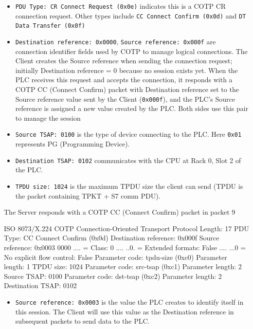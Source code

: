 \documentclass[../main.tex]{subfiles}
\begin{document}
\begin{itemize}
    \item \texttt{PDU Type: CR Connect Request (0x0e)} indicates this is a COTP CR connection request. Other types include \texttt{CC Connect Confirm (0x0d)} and \texttt{DT Data Transfer (0x0f)}

    \item \texttt{Destination reference: 0x0000}, \texttt{Source reference: 0x000f} are connection identifier fields used by COTP to manage logical connections. The Client creates the Source reference when sending the connection request; initially Destination reference = 0 because no session exists yet. When the PLC receives this request and accepts the connection, it responds with a COTP CC (Connect Confirm) packet with Destination reference set to the Source reference value sent by the Client (\texttt{0x000f}), and the PLC's Source reference is assigned a new value created by the PLC. Both sides use this pair to manage the session

    \item \texttt{Source TSAP: 0100} is the type of device connecting to the PLC. Here \texttt{0x01} represents PG (Programming Device).

    \item \texttt{Destination TSAP: 0102} communicates with the CPU at Rack 0, Slot 2 of the PLC.

    \item \texttt{TPDU size: 1024} is the maximum TPDU size the client can send (TPDU is the packet containing TPKT + S7 comm PDU).
\end{itemize}

The Server responds with a COTP CC (Connect Confirm) packet in packet 9

\begin{packetdump}
ISO 8073/X.224 COTP Connection-Oriented Transport Protocol
    Length: 17
    PDU Type: CC Connect Confirm (0x0d)
    Destination reference: 0x000f
    Source reference: 0x0003
    0000 .... = Class: 0
    .... ..0. = Extended formats: False
    .... ...0 = No explicit flow control: False
    Parameter code: tpdu-size (0xc0)
    Parameter length: 1
    TPDU size: 1024
    Parameter code: src-tsap (0xc1)
    Parameter length: 2
    Source TSAP: 0100
    Parameter code: dst-tsap (0xc2)
    Parameter length: 2
    Destination TSAP: 0102
\end{packetdump}

\begin{itemize}
    \item \texttt{Source reference: 0x0003} is the value the PLC creates to identify itself in this session. The Client will use this value as the Destination reference in subsequent packets to send data to the PLC.
\end{itemize}
\end{document}
